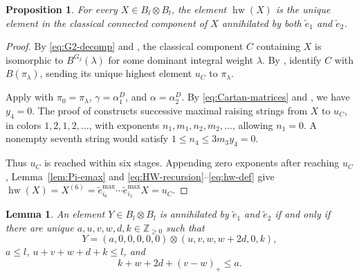 \documentclass[11pt,reqno]{amsart}
\newcommand{\Zge}{\mathbb Z_{\ge 0}}
\newcommand{\hw}{\operatorname{hw}}
\numberwithin{table}{section}
\numberwithin{equation}{section}
\theoremstyle{plain}
\newtheorem{lemma}[theorem]{Lemma}
\newtheorem{proposition}[theorem]{Proposition}
\theoremstyle{definition}
\begin{document}
\begin{proposition}\label{prop:hw-highest}
	For every \(X\in B_l\otimes B_l\), the element \(\hw(X)\) is the
	unique element in the classical connected component of \(X\)
	annihilated by both \(\widetilde e_1\) and \(\widetilde e_2\).
\end{proposition}

\begin{proof}
	By \eqref{eq:G2-decomp} and
	\cite[Theorems~2.4.2--2.4.3]{KMN1}, the classical component \(C\)
	containing \(X\) is isomorphic to \(B^{G_2}(\lambda)\) for some
	dominant integral weight \(\lambda\).
	By \cite[Theorem~4.1]{KashiwaraSimilarity}, identify \(C\) with
	\(B(\pi_\lambda)\), sending its unique highest element \(u_C\)
	to \(\pi_\lambda\).
	
	Apply
	\cite[Lemma~11.1(c), Theorem~11.3 and its proof]{LittelmannRO}
	with \(\pi_0=\pi_\lambda\), \(\gamma=\alpha_1^D\), and
	\(\alpha=\alpha_2^D\).
	By \eqref{eq:Cartan-matrices} and
	\cite[Lemma~11.1(c)]{LittelmannRO}, we have \(y_4=0\).
	The proof of \cite[Theorem~11.3]{LittelmannRO} constructs
	successive maximal raising strings from \(X\) to \(u_C\),
	in colors \(1,2,1,2,\ldots\), with exponents
	\(n_1,m_1,n_2,m_2,\ldots\), allowing \(n_1=0\).
	A nonempty seventh string would satisfy $1\le n_4\le3m_3y_4=0$.

	Thus \(u_C\) is reached within six stages.
	Appending zero exponents after reaching \(u_C\),
	Lemma~\ref{lem:Pi-emax} and
	\eqref{eq:HW-recursion}--\eqref{eq:hw-def} give $\hw(X)
	=
	X^{(6)}
	=
	\widetilde e_{i_6}^{\max}\cdots
	\widetilde e_{i_1}^{\max}X
	=
	u_C$.
\end{proof}

\begin{lemma}\label{lem:highest-shape}
	An element \(Y\in B_l\otimes B_l\) is annihilated by
	\(\widetilde e_1\) and \(\widetilde e_2\) if and only if there are
	unique \(a,u,v,w,d,k\in\Zge\) such that
	\begin{equation}\label{eq:highest-shape}
		Y
		=
		(a,0,0,0,0,0)
		\otimes
		(u,v,w,w+2d,0,k),
	\end{equation}
	\(a\le l\), \(u+v+w+d+k\le l\), and
	\begin{equation}\label{eq:highest-admissibility}
		k+w+2d+(v-w)_+\le a.
	\end{equation}
\end{lemma}
\end{document}
